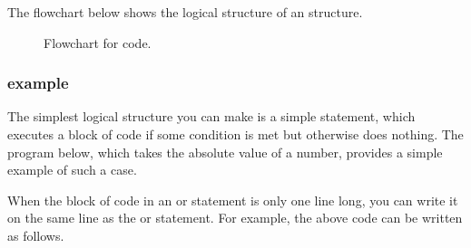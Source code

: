 \documentclass[letterpaper,10pt,english]{sphinxmanual}
\begin{document}
\begin{sphinxVerbatim}[commandchars=\\\{\},numbers=left,firstnumber=1,stepnumber=1]
\end{sphinxVerbatim}

\sphinxAtStartPar
The flowchart below shows the logical structure of an \sphinxhyphen{} structure.

\begin{figure}[htbp]
\centering
\capstart

\noindent{}
\caption{Flowchart for \sphinxhyphen{} code.}\label{\detokenize{chap6/chap6_loopsconds:id2}}\label{\detokenize{chap6/chap6_loopsconds:fig-flow-if-else}}\end{figure}


\subsubsection{ example}
\label{\detokenize{chap6/chap6_loopsconds:if-example}}
\sphinxAtStartPar
The simplest logical structure you can make is a simple  statement, which executes a block of code if some condition is met but otherwise does nothing.  The program below, which takes the absolute value of a number, provides a simple example of such a case.

\begin{sphinxVerbatim}[commandchars=\\\{\}]
\end{sphinxVerbatim}

\sphinxAtStartPar
When the block of code in an  or  statement is only one line long, you can write it on the same line as the  or  statement.  For example, the above code can be written as follows.
\end{document}

